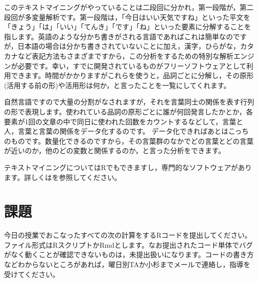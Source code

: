 \documentclass{ltjsbook}
\begin{document}
このテキストマイニングがやっていることは二段回に分かれ，第一段階が，第二段回が多変量解析です。第一段階は，「今日はいい天気ですね」といった平文を「きょう」「は」「いい」「てんき」「です」「ね」といった要素に分解することを指します。英語のような分かち書きがされる言語であればこれは簡単なのですが，日本語の場合は分かち書きされていないことに加え，漢字，ひらがな，カタカナなど表記方法もさまざまですから，この分析をするための特別な解析エンジンが必要です。幸い，すでに開発されているものがフリーソフトウェアとして利用できます。時間がかかりますがこれらを使うと，品詞ごとに分解し，その原形(活用する前の形)や活用形は何か，と言ったことを一覧にしてくれます。

自然言語ですので大量の分割がなされますが，それを言葉同士の関係を表す行列の形で表現します。使われている品詞の原形ごとに誰が何回発言したかとか，各要素が1回の文章の中で同日に使われた回数をカウントするなどして，言葉と人，言葉と言葉の関係をデータ化するのです。
データ化できればあとはこっちのものです。数量化できるのですから，その言葉群のなかでどの言葉とどの言葉が近いのか，他のどの変数と関係するのか，と言った分析をできます。

テキストマイニングについてはRでもできますし，専門的なソフトウェアがあります。詳しくは\citet{Higuchu20200406}を参照してください。


\section{課題}
今日の授業でおこなったすべての次の計算をするRコードを提出してください。ファイル形式はRスクリプトかRmdとします。なお提出されたコード単体でバグがなく動くことが確認できないものは，未提出扱いになります。コードの書き方などわからないところがあれば，曜日別TAか小杉までメールで連絡し，指導を受けてください。
\end{document}
